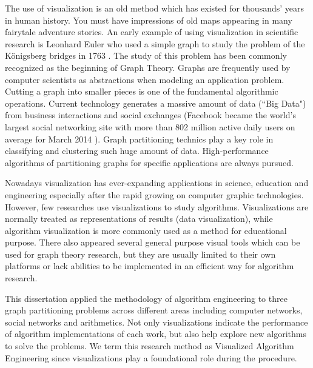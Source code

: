 The use of visualization is an old method which has existed for thousands' years in human history.  You must have impressions of old maps appearing in many fairytale adventure stories. An early example of using visualization in scientific research is Leonhard Euler who used a simple graph to study the problem of the Königsberg bridges in 1763 \cite{biggs1986graph}. The study of this problem has been commonly recognized as the beginning of Graph Theory. Graphs are frequently used by computer scientists as abstractions when modeling an application problem. Cutting a graph into smaller pieces is one of the fundamental algorithmic operations. Current technology generates a massive amount of data (``Big Data") from business interactions and social exchanges (Facebook became the world's largest social networking site with more than 802 million active daily users on average for March 2014 \cite{bright2015too}). Graph partitioning technics play a key role in classifying and clustering such huge amount of data. High-performance algorithms of partitioning graphs for specific applications are always pursued.

Nowadays visualization has ever-expanding applications in science, education and engineering especially after the rapid growing on computer graphic technologies. However, few researches use visualizations to study algorithms. Visualizations are normally treated as representations of results (data visualization), while algorithm visualization is more commonly used as a method for educational purpose. There also appeared several general purpose visual tools which can be used for graph theory research, but they are usually limited to their own platforms or lack abilities to be implemented in an efficient way for algorithm research.
 
This dissertation applied the methodology of algorithm engineering to three graph partitioning problems across different areas including computer networks, social networks and arithmetics.  Not only visualizations indicate the performance of algorithm implementations of each work, but also help explore new algorithms to solve the problems. We term this research method as Visualized Algorithm Engineering since visualizations play a foundational role during the procedure.